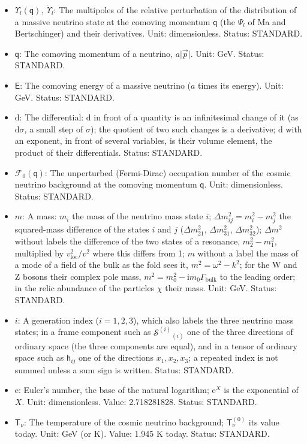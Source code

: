 \documentclass[
  10pt,
]{article}
\begin{document}
\begin{itemize}
  dimensionless. Status: STANDARD.
\item
  \(\Upsilon_l(\mathsf{q}),\ \dot\Upsilon_l\): The multipoles of the
  relative perturbation of the distribution of a massive neutrino state
  at the comoving momentum \(\mathsf{q}\) (the \(\Psi_l\) of Ma and
  Bertschinger) and their derivatives. Unit: dimensionless. Status:
  STANDARD.
\item
  \(\mathsf{q}\): The comoving momentum of a neutrino,
  \(a\lvert\vec p\rvert\). Unit: GeV. Status: STANDARD.
\item
  \(\mathsf{E}\): The comoving energy of a massive neutrino (\(a\) times
  its energy). Unit: GeV. Status: STANDARD.
\item
  \(\mathrm{d}\): The differential: \(\mathrm{d}\) in front of a
  quantity is an infinitesimal change of it (as \(\mathrm{d}\sigma\), a
  small step of \(\sigma\)); the quotient of two such changes is a
  derivative; \(\mathrm{d}\) with an exponent, in front of several
  variables, is their volume element, the product of their
  differentials. Status: STANDARD.
\item
  \(\mathcal{F}_0(\mathsf{q})\): The unperturbed (Fermi-Dirac)
  occupation number of the cosmic neutrino background at the comoving
  momentum \(\mathsf{q}\). Unit: dimensionless. Status: STANDARD.
\item
  \(m\): A mass: \(m_i\) the mass of the neutrino mass state \(i\);
  \(\Delta m_{ij}^2 = m_i^2 - m_j^2\) the squared-mass difference of the
  states \(i\) and \(j\) (\(\Delta m_{21}^2\), \(\Delta m_{31}^2\),
  \(\Delta m_{32}^2\)); \(\Delta m^2\) without labels the difference of
  the two states of a resonance, \(m_2^2 - m_1^2\), multiplied by
  \(v_{\mathrm{loc}}^2/v^2\) where this differs from 1; \(m\) without a
  label the mass of a mode of a field of the bulk as the fold sees it,
  \(m^2 = \omega^2 - k^2\); for the W and Z bosons their complex pole
  mass, \(m^2 = m_0^2 - \mathrm{i}m_0\Gamma_{\mathrm{bulk}}\) to the
  leading order; in the relic abundance of the particles \(\chi\) their
  mass. Unit: GeV. Status: STANDARD.
\item
  \(i\): A generation index (\(i = 1, 2, 3\)), which also labels the
  three neutrino mass states; in a frame component such as
  \(\mathcal{S}^{(i)}{}_{(i)}\) one of the three directions of ordinary
  space (the three components are equal), and in a tensor of ordinary
  space such as \(\mathsf{h}_{ij}\) one of the directions
  \(x_1, x_2, x_3\); a repeated index is not summed unless a sum sign is
  written. Status: STANDARD.
\item
  \(\mathrm{e}\): Euler's number, the base of the natural logarithm;
  \(\mathrm{e}^{X}\) is the exponential of \(X\). Unit: dimensionless.
  Value: 2.718281828. Status: STANDARD.
\item
  \(\mathsf{T}_\nu\): The temperature of the cosmic neutrino background;
  \(\mathsf{T}_\nu^{(0)}\) its value today. Unit: GeV (or K). Value:
  1.945 K today. Status: STANDARD.
\end{itemize}
\end{document}
